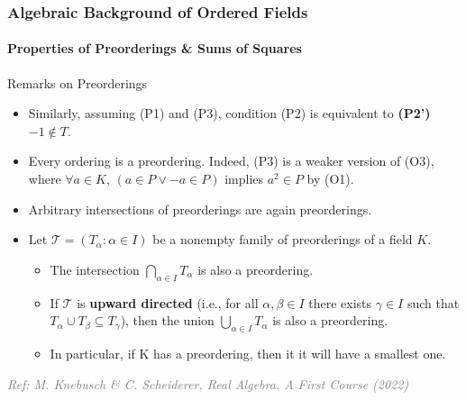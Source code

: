 \documentclass[11pt]{beamer}
\begin{document}
\begin{frame}
    \frametitle{Algebraic Background of Ordered Fields}
    \framesubtitle{Properties of Preorderings \& Sums of Squares}
    
    \begin{alertblock}{Remarks on Preorderings}
        \begin{itemize}
            \setlength{\itemsep}{0.3em}
            \item Similarly, assuming (P1) and (P3), condition (P2) is equivalent to \textbf{(P2') $-1 \notin T$}.
            \item Every ordering is a preordering. Indeed, (P3) is a weaker version of (O3), where  
            $\forall a \in K$, 
            $ (a \in P \lor -a \in P) $ implies $a^2 \in P$ by (O1).
            \item Arbitrary intersections of preorderings are again preorderings.
            \item Let $\mathcal{T} = (T_\alpha : \alpha \in I)$ be a nonempty family of preorderings of a field $K$.
            \vspace{0.4em}
            \begin{itemize}
                \setlength{\itemsep}{0.4em}
                \item The intersection $\bigcap_{\alpha \in I} T_\alpha$ is also a preordering.
                
                \item If $\mathcal{T}$ is \textbf{upward directed} (i.e., for all $\alpha, \beta \in I$ there exists $\gamma \in I$ such that $T_\alpha \cup T_\beta \subseteq T_\gamma$), then the union $\bigcup_{\alpha \in I} T_\alpha$ is also a preordering.
                \item In particular, if K has a preordering, then it it will have a smallest one.
            \end{itemize}
        \end{itemize}
    \end{alertblock}

    
    \vspace*{\fill}
    \hfill \textcolor{gray}{\tiny \textit{Ref: M. Knebusch \& C. Scheiderer, Real Algebra. A First Course (2022)}}
\end{frame}
\end{document}
